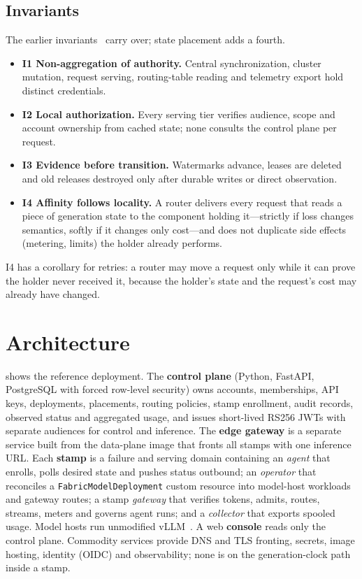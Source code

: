 \documentclass[conference,letterpaper]{IEEEtran}
\newcommand{\code}[1]{\texttt{\small #1}}
\begin{document}
\subsection{Invariants}
\label{sec:invariants}
The earlier invariants~\cite{priorpaper} carry over; state placement adds a fourth.
\begin{itemize}
  \item \textbf{I1 Non-aggregation of authority.} Central synchronization, cluster mutation,
  request serving, routing-table reading and telemetry export hold distinct credentials.
  \item \textbf{I2 Local authorization.} Every serving tier verifies audience, scope and
  account ownership from cached state; none consults the control plane per request.
  \item \textbf{I3 Evidence before transition.} Watermarks advance, leases are deleted and old
  releases destroyed only after durable writes or direct observation.
  \item \textbf{I4 Affinity follows locality.} A router delivers every request that reads a
  piece of generation state to the component holding it---strictly if loss changes semantics,
  softly if it changes only cost---and does not duplicate side effects (metering, limits) the
  holder already performs.
\end{itemize}
I4 has a corollary for retries: a router may move a request only while it can prove the
holder never received it, because the holder's state and the request's cost may already have
changed.

\section{Architecture}
\label{sec:arch}

 shows the reference deployment. The \textbf{control plane} (Python, FastAPI,
PostgreSQL with forced row-level security) owns accounts, memberships, API keys,
deployments, placements, routing policies, stamp enrollment, audit records, observed status
and aggregated usage, and issues short-lived RS256 JWTs with separate audiences for control
and inference. The \textbf{edge gateway} is a separate service built from the data-plane
image that fronts all stamps with one inference URL. Each \textbf{stamp} is a failure and
serving domain containing an \emph{agent} that enrolls, polls desired state and pushes status
outbound; an \emph{operator} that reconciles a \code{FabricModelDeployment} custom resource
into model-host workloads and gateway routes; a stamp \emph{gateway} that verifies tokens,
admits, routes, streams, meters and governs agent runs; and a \emph{collector} that exports
spooled usage. Model hosts run unmodified vLLM~\cite{vllm}. A web \textbf{console} reads only
the control plane. Commodity services provide DNS and TLS fronting, secrets, image hosting,
identity (OIDC) and observability; none is on the generation-clock path inside a stamp.
\end{document}
